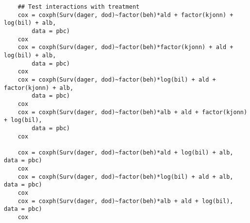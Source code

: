 \documentclass[11pt,a4paper]{article}
\begin{document}
\begin{appendices}
\begin{verbatim}
    ## Test interactions with treatment
    cox = coxph(Surv(dager, dod)~factor(beh)*ald + factor(kjonn) + log(bil) + alb, 
        data = pbc)
    cox 
    cox = coxph(Surv(dager, dod)~factor(beh)*factor(kjonn) + ald + log(bil) + alb, 
        data = pbc)
    cox 
    cox = coxph(Surv(dager, dod)~factor(beh)*log(bil) + ald + factor(kjonn) + alb,
        data = pbc)
    cox 
    cox = coxph(Surv(dager, dod)~factor(beh)*alb + ald + factor(kjonn) + log(bil),
        data = pbc)
    cox 

    cox = coxph(Surv(dager, dod)~factor(beh)*ald + log(bil) + alb, data = pbc)
    cox 
    cox = coxph(Surv(dager, dod)~factor(beh)*log(bil) + ald + alb, data = pbc)
    cox 
    cox = coxph(Surv(dager, dod)~factor(beh)*alb + ald + log(bil), data = pbc)
    cox 

    \end{verbatim}

\end{appendices}





%
%

%
%
\end{document}
